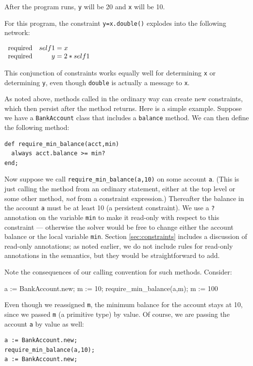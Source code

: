 \documentclass{article}
\begin{document}
After the program runs, \verb|y| will be 20 and \verb|x| will be 10.

For this program, the constraint \verb|y=x.double()| explodes into the
following network:

$\begin{array}{rr@{\;=\;}l}
\mathrm{required} & self1 & x\\
\mathrm{required} & y & 2*self1
\end{array}$
 
This conjunction of constraints works equally well for determining
\verb|x| or determining \verb|y|, even though \verb|double| is
actually a message to \verb|x|.

As noted above, methods called in the ordinary way can create new
constraints, which then persist after the method returns.  Here is a
simple example.  Suppose we have a \verb|BankAccount| class that
includes a \verb|balance| method.  We can then define the following method:

\begin{verbatim}
def require_min_balance(acct,min)
  always acct.balance >= min?
end;
\end{verbatim}

Now suppose we call \verb|require_min_balance(a,10)| on some account
\verb|a|.  (This is just calling the method from an ordinary
statement, either at the top level or some other method, \emph{not}
from a constraint expression.)  Thereafter the balance in the account
\verb|a| must be at least 10 (a persistent constraint).  We use a
\verb|?| annotation on the variable \verb|min| to make it read-only
with respect to this constraint --- otherwise the solver would be free
to change either the account balance or the local variable \verb|min|.
Section \ref{sec:constraints} includes a discussion of read-only
annotations; as noted earlier, we do not include rules for read-only
annotations in the semantics, but they would be straightforward to
add.

Note the consequences of our calling convention for such methods.
Consider:
\begin{example}
a := BankAccount.new;
m := 10;
require_min_balance(a,m);
m := 100
\end{example}
Even though we reassigned \verb|m|, the minimum balance for the
account stays at 10, since we passed \verb|m| (a primitive type) by
value.  Of course, we are passing the account \verb|a| by value as well:

\begin{verbatim}
a := BankAccount.new;
require_min_balance(a,10);
a := BankAccount.new;
\end{verbatim}
\end{document}
